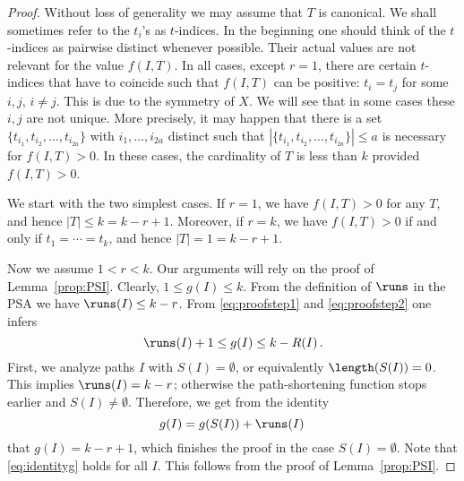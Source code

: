\begin{proof}
Without loss of generality we may assume that $T$ is canonical. 
We shall sometimes refer to the $t_i$'s as $t$-indices. 
In the beginning one should think of the $t$-indices as pairwise distinct whenever possible. 
Their actual values are not relevant for the value $f(I,T)$. In all cases, except $r=1$, there are certain $t$-indices that have to coincide such that $f(I,T)$ can be positive: $t_i=t_j$ for some $i,j$, $i\neq j$. This is due to the symmetry of $X$.
We will see that in some cases these $i,j$ are not unique. More precisely, it may happen that there is a set $\{ t_{i_1}, t_{i_2}, \ldots,t_{i_{2a}}\}$ with $i_1, \ldots,i_{2a}$ distinct such that $|\{ t_{i_1}, t_{i_2}, \ldots,t_{i_{2a}}\}|\le a$ is necessary for $f(I,T)>0$. In these cases, the cardinality of
$T$ is less than $k$ provided $f(I,T)>0$.  
\par
We start with the two simplest cases. If $r=1$, we have $f(I,T)>0$ for any $T$, and 
hence $|T|\le k = k-r+1$. Moreover, if $r=k$, we have $f(I,T)>0$ if and only if $t_1=\cdots=t_k$, and hence $|T|=1 = k-r+1$.
\par
Now we assume $1<r<k$.
Our arguments will rely on the proof of Lemma~\ref{prop:PSI}.
Clearly, $1\le g(I)\le k$. From the definition of $\runs$ in the PSA we have $\runs(I)\le k-r$. From \eqref{eq:proofstep1} and \eqref{eq:proofstep2} one infers 
\begin{equation}\label{eq:sglmsoe}
\runs(I)+1\le g(I)\le k-R(I)\,.
\end{equation}
First, we analyze paths $I$ with $S(I)=\emptyset$, or equivalently $\length(S(I))=0$. This implies $\runs(I)=k-r$; otherwise the path-shortening function stops earlier and $S(I)\neq \emptyset$. Therefore, we get from the identity
\begin{equation}\label{eq:identityg}
g(I)=g(S(I)) + \runs(I)\,
\end{equation}
that $g(I)= k-r+1$, which finishes the proof in the case $S(I)=\emptyset$. 
Note that \eqref{eq:identityg} holds for all $I$. This follows from the proof of Lemma~\ref{prop:PSI}.
\par


\end{proof}
